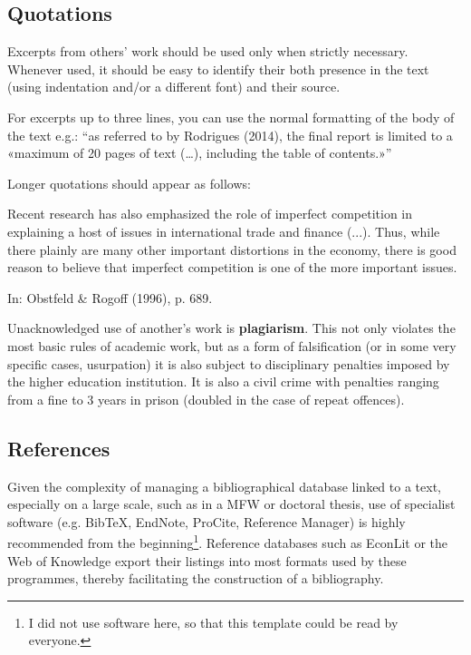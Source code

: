 \documentclass [12pt,a4paper,oneside]{article}
\begin{document}
	\subsection{Quotations}

Excerpts from others’ work should be used only when strictly necessary. Whenever used, it should be easy to identify their both presence in the text (using indentation and/or a different font) and their source.

For excerpts up to three lines, you can use the normal formatting of the body of the text e.g.: “as referred to by Rodrigues (2014), the final report is limited to a «maximum of 20 pages of text (…), including the table of contents.»”

Longer quotations should appear as follows:

\begin{displayquote}
{\small Recent research has also emphasized the role of imperfect competition in explaining a host of issues in international trade and finance (...). Thus, while there plainly are many other important distortions in the economy, there is good reason to believe that imperfect competition is one of the more important issues.}
\begin{flushright}
In: Obstfeld \& Rogoff (1996), p. 689.
\end{flushright}
\end{displayquote}

Unacknowledged use of another’s work is \textbf{plagiarism}. This not only violates the most basic rules of academic work, but as a form of falsification (or in some very specific cases, usurpation) it is also subject to disciplinary penalties imposed by the higher education institution. It is also a civil crime with penalties ranging from a fine to 3 years in prison (doubled in the case of repeat offences).

	\subsection{References}

Given the complexity of managing a bibliographical database linked to a text, especially on a large scale, such as in a MFW or doctoral thesis, use of specialist software (e.g. BibTeX, EndNote, ProCite, Reference Manager) is highly recommended from the beginning\footnote{I did not use software here, so that this template could be read by everyone.}. Reference databases such as EconLit or the Web of Knowledge export their listings into most formats used by these programmes, thereby facilitating the construction of a bibliography.
\end{document}
